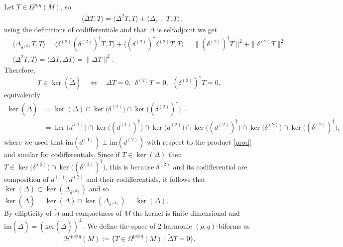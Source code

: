 \documentclass[a4paper,12pt]{article}
\newcommand{\Ltwo}[2]{\langle #1,#2\rangle}
\begin{document}
Let $T\in \Omega^{p,q}(M)$, so
\begin{equation}
\begin{aligned}
&\Ltwo{\widetilde{\Delta}T}{T}=\Ltwo{{\Delta^2}T}{T}+\Ltwo{{\Delta_{\delta^{(2)}}}T}{T};
\end{aligned}
\end{equation}
using the definitions of codifferentials and that $\Delta$ is selfadjoint we get
\begin{equation}
\begin{aligned}
    &\big\langle \Delta_{\delta^{(2)}} T , T \big\rangle
=\big\langle \delta^{(2)}(\delta^{(2)})^{\dagger}T , T \big\rangle
+\big\langle (\delta^{(2)})^{\dagger}\delta^{(2)}T , T \big\rangle
=\|(\delta^{(2)})^{\dagger}T\|^{2}+\|\delta^{(2)}T\|^{2}\\
&\langle \Delta^{2}T, T\rangle = \langle \Delta T, \Delta T\rangle = \|\Delta T\|^{2}.
\end{aligned}
\end{equation}
Therefore,
\[
T\in\ker(\widetilde{\Delta})
\quad\Leftrightarrow\quad
\Delta T=0,\ \ \delta^{(2)}T=0,\ \ (\delta^{(2)})^{\dagger}T=0,
\]
equivalently
\begin{equation}
\begin{aligned}
\ker(\widetilde{\Delta})
&=\ker(\Delta)\cap \ker\big(\delta^{(2)}\big)\cap \ker\big((\delta^{(2)})^{\dagger}\big)=\\
&= \ker\big(d^{(1)}\big)\cap \ker\big((d^{(1)})^{\dagger}\big)\cap \ker\big(d^{(2)}\big)\cap \ker\big((d^{(2)})^{\dagger}\big)\cap \ker\big(\delta^{(2)}\big)\cap \ker\big((\delta^{(2)})^{\dagger}\big),
\end{aligned}
\end{equation}
where we used that $\text{im}(d^{(1)}) \perp \text{im}(d^{(2)})$ with respect to the product \eqref{prod} and similar for codifferentials. Since if $T \in \ker(\Delta)$ then $T \in \ker\big(\delta^{(2)}\big)\cap \ker\big((\delta^{(2)})^{\dagger}\big)$, this is because $\delta^{(2)}$ and its codifferential are composition of $d^{(1)},d^{(2)}$ and their codifferentials, it follows that $\ker(\Delta) \subset \ker({\Delta}_{\delta^{(2)}})$ and so $\ker(\widetilde{\Delta}) = \ker(\Delta) \cap \ker({\Delta}_{\delta^{(2)}})= \ker({\Delta})$.\\
By ellipticity of $\widetilde{\Delta}$ and compactness of $M$ the kernel is finite-dimensional and $\text{im}(\widetilde{\Delta})=(\text{ker}(\widetilde{\Delta}))^{\perp}$. We define the space of 2-harmonic $(p,q)$-biforms as
\begin{equation}
    \mathcal{H}^{p \otimes q}(M):=\{T \in \Omega^{p \otimes q}(M) \ | \ \widetilde{\Delta}T=0\}.
\end{equation}
\end{document}
